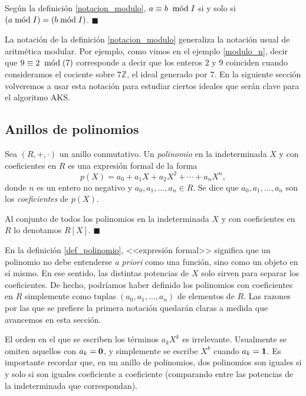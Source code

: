 \begin{remark}
Según la definición \ref{notacion_modulo}, $a \equiv b \modu I$ si y solo si $(a \minimodu I) = (b \minimodu I)$. 
\hfill$\blacksquare$
\end{remark}

La notación de la definición \ref{notacion_modulo} generaliza la notación usual de aritmética modular. Por ejemplo, como vimos en el ejemplo \ref{modulo_n}, decir que $9 \equiv 2 \modu (7)$ corresponde a decir que los enteros $2$ y $9$ coinciden cuando consideramos el cociente sobre $7\mathbb{Z}$, el ideal generado por $7$.
En la siguiente sección volveremos a usar esta notación para estudiar ciertos ideales que serán clave para el algoritmo AKS.

\subsection{Anillos de polinomios}

\begin{definition} \label{def_polinomio}
Sea $(R, +, \cdot)$ un anillo conmutativo. Un \emph{polinomio} en la indeterminada $X$ y con coeficientes en $R$ es una expresión formal de la forma
$$p(X) = a_0 + a_1X + a_2X^2 + \cdots + a_n X^n,$$
donde $n$ es un entero no negativo y $a_0, a_1, \dots, a_n \in R$. Se dice que $a_0, a_1, \dots, a_n$ son los \emph{coeficientes} de $p(X)$.

Al conjunto de todos los polinomios en la indeterminada $X$ y con coeficientes en $R$ lo denotamos $R[X]$. 
\hfill$\blacksquare$
\end{definition}

En la definición \ref{def_polinomio}, <<expresión formal>> significa que un polinomio no debe entenderse \textit{a priori} como una función, sino como un objeto en sí mismo. En ese sentido, las distintas potencias de $X$ solo sirven para separar los coeficientes. De hecho, podríamos haber definido los polinomios con coeficientes en $R$ simplemente como tuplas $(a_0, a_1, \dots, a_n)$ de elementos de $R$. Las razones por las que se prefiere la primera notación quedarán claras a medida que avancemos en esta sección.

El orden en el que se escriben los términos $a_k X^k$ es irrelevante. Usualmente se omiten aquellos con $a_k=\0$, y simplemente se escribe $X^k$ cuando $a_k = \1$. Es importante recordar que, en un anillo de polinomios, dos polinomios son iguales si y solo si son iguales coeficiente a coeficiente (comparando entre las potencias de la indeterminada que correspondan).

